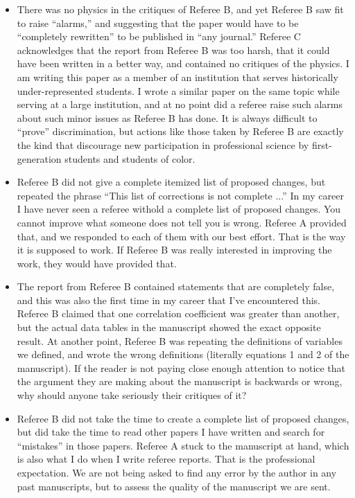 \documentclass[12pt]{article}
\begin{document}
\begin{itemize}
\item There was no physics in the critiques of Referee B, and yet Referee B saw fit to raise ``alarms,'' and suggesting that the paper would have to be ``completely rewritten'' to be published in ``any journal.''  Referee C acknowledges that the report from Referee B was too harsh, that it could have been written in a better way, and contained no critiques of the physics.  I am writing this paper as a member of an institution that serves historically under-represented students.  I wrote a similar paper on the same topic while serving at a large institution, and at no point did a referee raise such alarms about such minor issues as Referee B has done.  It is always difficult to ``prove'' discrimination, but actions like those taken by Referee B are exactly the kind that discourage new participation in professional science by first-generation students and students of color.
\item Referee B did not give a complete itemized list of proposed changes, but repeated the phrase ``This list of corrections is not complete ...'' In my career I have never seen a referee withold a complete list of proposed changes.  You cannot improve what someone does not tell you is wrong.  Referee A provided that, and we responded to each of them with our best effort.  That is the way it is supposed to work.  If Referee B was really interested in improving the work, they would have provided that.
\item The report from Referee B contained statements that are completely false, and this was also the first time in my career that I've encountered this.  Referee B claimed that one correlation coefficient was greater than another, but the actual data tables in the manuscript showed the exact opposite result.  At another point, Referee B was repeating the definitions of variables we defined, and wrote the wrong definitions (literally equations 1 and 2 of the manuscript).  If the reader is not paying close enough attention to notice that the argument they are making about the manuscript is backwards or wrong, why should anyone take seriously their critiques of it?
\item Referee B did not take the time to create a complete list of proposed changes, but did take the time to read other papers I have written and search for ``mistakes'' in those papers.  Referee A stuck to the manuscript at hand, which is also what I do when I write referee reports.  That is the professional expectation.  We are not being asked to find any error by the author in any past manuscripts, but to assess the quality of the manuscript we are sent.
\end{itemize}
\end{document}
